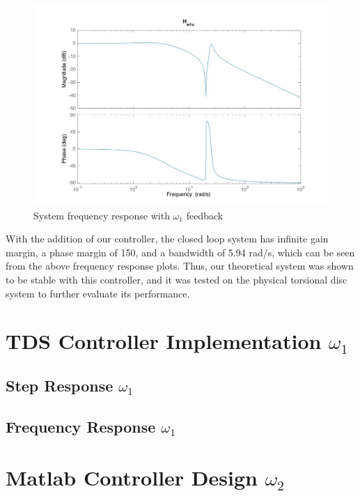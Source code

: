 \documentclass[11pt,titlepage]{article}
\begin{document}
	\begin{figure}[H]
        		\centering
        		\includegraphics[trim={6cm 0 1cm 1cm},clip,origin=c,scale=0.35]{w1_bode}
        		\caption{System frequency response with $\omega_1$ feedback}
        		\label{fig:w1_bode}
    	\end{figure}
	
	With the addition of our controller, the closed loop system has infinite gain margin, a phase margin of 150\degree, and a bandwidth of 5.94 rad/s, which can be seen from the above frequency response plots. Thus, our theoretical system was shown to be stable with this controller, and it was tested on the physical torsional disc system to further evaluate its performance. 

\section{TDS Controller Implementation $\omega_1$}

	
	
	\subsection{Step Response $\omega_1$}

	\subsection{Frequency Response $\omega_1$}

\section{Matlab Controller Design $\omega_2$}
	
\end{document}
